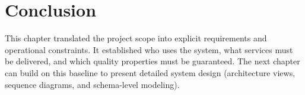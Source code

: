 \section*{Conclusion}
This chapter translated the project scope into explicit requirements and operational constraints. It established who uses the system, what services must be delivered, and which quality properties must be guaranteed. The next chapter can build on this baseline to present detailed system design (architecture views, sequence diagrams, and schema-level modeling).
